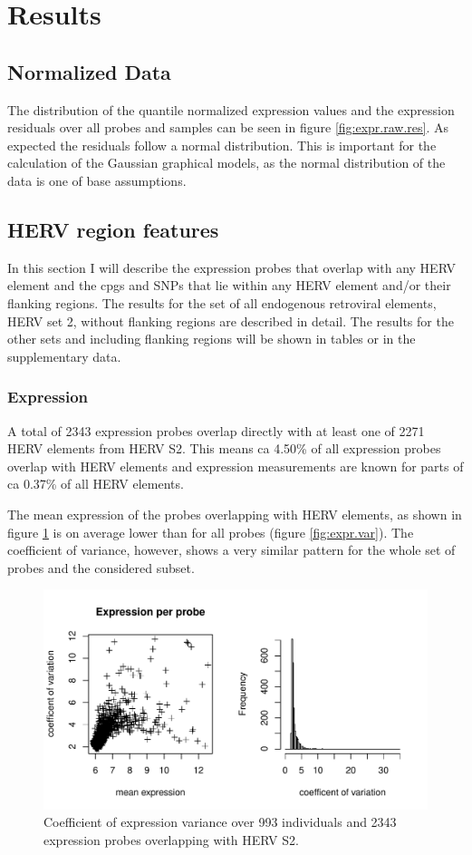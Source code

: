 \documentclass[a4paper,12pt]{article}
\begin{document}
\newpage
\section{Results}
\subsection{Normalized Data}
The distribution of the quantile normalized expression values and the expression residuals over all probes and samples can be seen in figure \ref{fig:expr.raw.res}. As expected the residuals follow a normal distribution. This is important for the calculation of the Gaussian graphical models, as the normal distribution of the data is one of base assumptions\cite{}.

\subsection{HERV region features}
In this section I will describe the expression probes that overlap with any HERV element and the cpgs and SNPs that lie within any HERV element and/or their flanking regions. The results for the set of all endogenous retroviral elements, HERV set 2, without flanking regions are described in detail. The results for the other sets and including flanking regions will be shown in tables or in the supplementary data.

\subsubsection{Expression}
A total of 2343 expression probes overlap directly with at least one of 2271 HERV elements from HERV S2. This means ca 4.50\% of all expression probes overlap with HERV elements and expression measurements are known for parts of ca 0.37\% of all HERV elements.

The mean expression of the probes overlapping with HERV elements, as shown in figure \ref{fig:hervS2.expr.var} is on average lower than for all probes (figure \ref{fig:expr.var}). The coefficient of variance, however, shows a very similar pattern for the whole set of probes and the considered subset.

\begin{figure}[tb]
	\includegraphics[scale = 1, keepaspectratio = true]{../figures/hervS2_expr_var}  
	\caption{Coefficient of expression variance over 993 individuals and 2343 expression probes overlapping with HERV S2.}
    \label{fig:hervS2.expr.var}
\end{figure}
\end{document}
